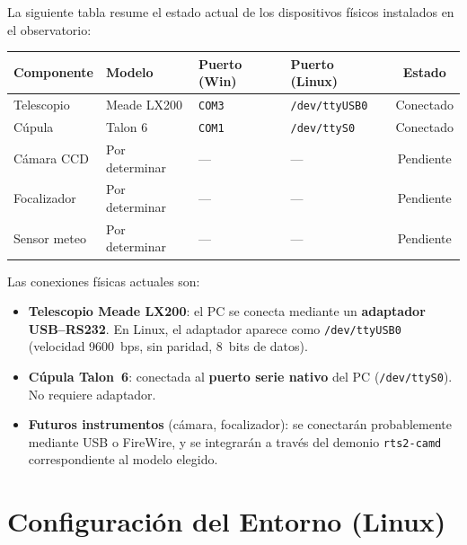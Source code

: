 \documentclass[12pt,a4paper,titlepage]{article}
\begin{document}
La siguiente tabla resume el estado actual de los dispositivos físicos instalados en el observatorio:

\begin{center}
\begin{tabular}{llllc}
  \toprule
  \textbf{Componente} & \textbf{Modelo} & \textbf{Puerto (Win)} & \textbf{Puerto (Linux)} & \textbf{Estado} \\
  \midrule
  Telescopio   & Meade LX200    & \texttt{COM3} & \texttt{/dev/ttyUSB0} & \textcolor{green!50!black}{Conectado} \\
  Cúpula       & Talon 6        & \texttt{COM1} & \texttt{/dev/ttyS0}   & \textcolor{green!50!black}{Conectado} \\
  Cámara CCD   & Por determinar & ---           & ---                   & \textcolor{orange!70!black}{Pendiente} \\
  Focalizador  & Por determinar & ---           & ---                   & \textcolor{orange!70!black}{Pendiente} \\
  Sensor meteo & Por determinar & ---           & ---                   & \textcolor{orange!70!black}{Pendiente} \\
  \bottomrule
\end{tabular}
\end{center}

Las conexiones físicas actuales son:

\begin{itemize}
  \item \textbf{Telescopio Meade LX200}: el PC se conecta mediante un \textbf{adaptador USB--RS232}. En Linux, el adaptador aparece como \texttt{/dev/ttyUSB0} (velocidad 9600~bps, sin paridad, 8~bits de datos).
  \item \textbf{Cúpula Talon~6}: conectada al \textbf{puerto serie nativo} del PC (\texttt{/dev/ttyS0}). No requiere adaptador.
  \item \textbf{Futuros instrumentos} (cámara, focalizador): se conectarán probablemente mediante USB o FireWire, y se integrarán a través del demonio \texttt{rts2-camd} correspondiente al modelo elegido.
\end{itemize}

\section{Configuración del Entorno (Linux)}
\end{document}
